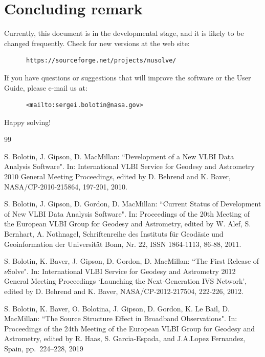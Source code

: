 \documentclass [10pt,letterpaper]{report}
\begin{document}
{{%
%
%
\chapter{Concluding remark}
\label{chapt_concluding_remark}
Currently, this document is in the developmental stage, and it is likely
to be changed frequently. Check for new versions at the web site:

\begin{verbatim}
      https://sourceforge.net/projects/nusolve/
\end{verbatim}

\noindent
If you have questions or suggestions that will improve the software or
the User Guide, please e-mail us at:

\begin{verbatim}
      <mailto:sergei.bolotin@nasa.gov>
\end{verbatim}

\noindent
Happy solving!


%
%
\begin{thebibliography}{99}

S. Bolotin, J. Gipson, D. MacMillan: ``Development of a New VLBI Data
Analysis Software". In: International VLBI Service for Geodesy and
Astrometry 2010 General Meeting Proceedings, edited by D. Behrend and K.
Baver, NASA/CP-2010-215864, 197-201, 2010.


S. Bolotin, J. Gipson, D. Gordon, D. MacMillan: ``Current Status of
Development of New VLBI Data Analysis Software". In: Proceedings of the
20th Meeting of the European VLBI Group for Geodesy and Astrometry,
edited by W. Alef, S. Bernhart, A. Nothnagel, Schriftenreihe des
Instituts f\"ur Geod\"asie und Geoinformation der Universit\"at Bonn,
Nr. 22, ISSN 1864-1113, 86-88, 2011.


S. Bolotin, K. Baver, J. Gipson, D. Gordon, D. MacMillan: ``The First
Release of $\nu$Solve". In: International VLBI Service for Geodesy and
Astrometry 2012 General Meeting Proceedings `Launching the
Next-Generation IVS Network', edited by D. Behrend and K. Baver,
NASA/CP-2012-217504, 222-226, 2012.

S. Bolotin, K. Baver, O. Bolotina, J. Gipson, D. Gordon, K. Le Bail, D. MacMillan:
``The Source Structure Effect in Broadband Observations".
In: Proceedings of the 24th Meeting of the European VLBI Group for
Geodesy and Astrometry,
edited by R. Haas, S. Garcia-Espada, and J.A.Lopez Fernandez,
Spain, pp.~224--228, 2019


\end{thebibliography}}}
\end{document}
